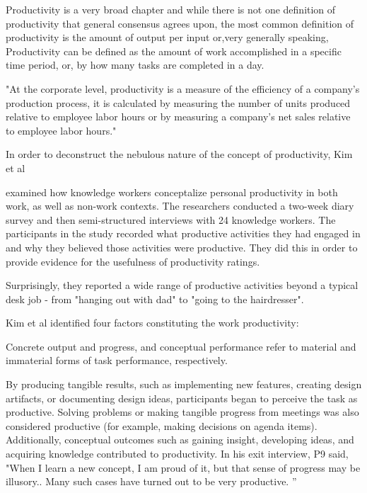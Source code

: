 
Productivity is a very broad chapter and while there is not
one definition of productivity that general consensus agrees upon,
the most common definition of productivity is the amount of
output per input or,very generally speaking, Productivity can be defined as the amount of work
accomplished in a specific time period,
or, by how many tasks are completed in a day.

"At the corporate level, productivity is
a measure of the efficiency of a company's production
process, it is calculated by measuring the number of
units produced relative to employee labor hours or by
measuring a company's net sales relative to employee labor hours."
\cite{Kenton2022Aug}

In order to deconstruct the nebulous nature of the concept of productivity, Kim et al 

\cite{Kim2019May} examined how knowledge workers conceptalize personal productivity in both work, as well as non-work contexts.
The researchers conducted a two-week diary survey and then semi-structured interviews with 24 knowledge workers.
The participants in the study recorded what productive activities they had engaged in and why they believed those activities were productive. They did this in order to provide evidence for the usefulness of productivity ratings.

Surprisingly, they reported a wide range of productive activities beyond a typical desk job - from "hanging out with dad" to "going to the hairdresser".



Kim et al \cite{Kim2019May} identified four factors constituting the work productivity:

Concrete output and progress, and conceptual performance refer to material and immaterial forms of task performance, respectively.

By producing tangible results, such as implementing  new features, creating design artifacts, or documenting  design ideas, participants began to perceive the task as productive. Solving problems or making tangible progress from meetings was also considered productive (for example, making decisions on agenda items). Additionally, conceptual outcomes such as gaining insight, developing ideas, and acquiring knowledge contributed to productivity. In his exit interview, P9 said, "When I learn a new concept, I am proud of it, but that sense of  progress may be illusory.. Many such cases have turned out to be very productive. ”


